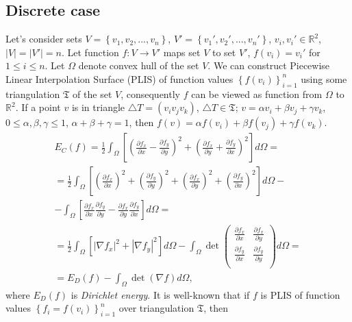 \documentclass{article}
\begin{document}
\subsection{Discrete case}
\label{sec:discrete}
Let's consider sets $V = \left\{v_1, v_2, ... , v_n\right\}$, $V' = \left\{v_1', v_2', ... , v_n'\right\}$, $v_i, v_i' \in \mathbb{R}^2$, $|V| = |V'| = n$. 
Let function $f: V \to V'$ maps set $V$ to set $V'$, $f(v_i) = v_i'$ for $1 \le i \le n$. Let $\Omega$ denote convex hull of the set $V$. 
We can construct Piecewise Linear Interpolation Surface (PLIS) of function values $\left\{f(v_i)\right\}_{i=1}^n$ 
using some triangulation $\mathfrak{T}$ of the set $V$, consequently $f$ can be viewed as function from $\Omega$ to~$\mathbb{R}^2$. 
If a point $v$ is in triangle $\triangle T = (v_i v_j v_k)$, $\triangle T \in \mathfrak{T}$;  $v = \alpha v_i + \beta v_j + \gamma v_k$, 
$0 \le \alpha, \beta, \gamma \le 1$, $\alpha + \beta + \gamma = 1$, then $f(v) = \alpha f(v_i) + \beta f(v_j) + \gamma f(v_k)$.
\begin{multline}
\label{formula:EC}
  E_C(f) = \frac{1}{2} \int_{\Omega}\left[{
      \left(\frac{\partial f_x}{\partial x} - \frac{\partial f_y}{\partial y}\right)^2 + 
      \left(\frac{\partial f_x}{\partial y} + \frac{\partial f_y}{\partial x}\right)^2}\right] d\Omega = \\
  = \frac{1}{2} \int_{\Omega}\left[\left(\frac{\partial f_x}{\partial x}\right)^2 + \left(\frac{\partial f_y}{\partial y}\right)^2 + \left(\frac{\partial f_x}{\partial y}\right)^2 + 
  \left(\frac{\partial f_y}{\partial x}\right)^2 \right] d\Omega - \\
  - \int_{\Omega}\left[\frac{\partial f_x}{\partial x} \frac{\partial f_y}{\partial y} - \frac{\partial f_x}{\partial y} \frac{\partial f_y}{\partial x}\right] d\Omega = \\
  = \frac{1}{2} \int_{\Omega} \left[ \left| \nabla f_x \right| ^ 2 + \left| \nabla f_y \right| ^ 2 \right] d\Omega - \int_{\Omega} \det {\begin{pmatrix} 
    \frac{\partial f_x}{\partial x} & \frac{\partial f_x}{\partial y} \\
    \frac{\partial f_y}{\partial x} & \frac{\partial f_y}{\partial y} \\
  \end{pmatrix}} d\Omega = \\
  = E_D(f) - \int_{\Omega} \det (\nabla f) d\Omega,
\end{multline}
where $E_D(f)$ is \textit{Dirichlet energy}. It is well-known \cite{Pinkall93} that if $f$ is PLIS of function values $\left\{f_i = f(v_i)\right\}_{i=1}^n$ over triangulation $\mathfrak{T}$, then  
\end{document}
